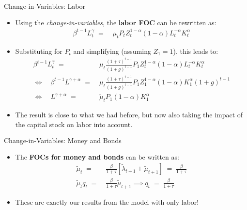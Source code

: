 \documentclass[10pt,c,aspectratio=1610,handout]{beamer}
\begin{document}
\begin{frame}{Change-in-Variables: Labor}%
  \begin{itemize}%
    \item[$\blacktriangleright$] Using the \emph{change-in-variables}, the \textbf{labor FOC} can be rewritten as:%
    \begin{align*}%
      \beta^{t-1} L_{t}^{\gamma} \; = & \; \mu_{t} P_{t} Z_{t}^{1-\alpha} (1-\alpha) L_{t}^{-\alpha} K_{t}^{\alpha}%
    \end{align*}%
    \vspace*{-0.1in}%
    \pause%
    \item[$\blacktriangleright$] Substituting for $P_t$ and simplifying (assuming $Z_1=1$), this leads to:%
    \begin{align*}%
      \beta^{t-1} L_{t}^{\gamma} \; = & \; \mu_{t} \frac{(1+\tau)^{t-1}}{(1+g)^{t-1}} P_{1} Z_{t}^{1-\alpha} (1-\alpha) L_{t}^{-\alpha} K_{t}^{\alpha}\\%
      \Leftrightarrow \quad \beta^{t-1} L^{\gamma +\alpha} \; = & \; \mu_{t} \frac{(1+\tau)^{t-1}}{(1+g)^{t-1}} P_{1} Z_{1}^{1-\alpha} (1-\alpha) K_{1}^{\alpha} (1+g)^{t-1}\\%
      \Leftrightarrow \quad L^{\gamma+\alpha} \; = & \; \tilde{\mu}_{t} P_{1} (1-\alpha) K_{1}^{\alpha}%
    \end{align*}%
    \vspace*{-0.1in}%
    \pause%
    \item[$\blacktriangleright$] The result is close to what we had before, but now also taking the impact of the capital stock on labor into account.%
  \end{itemize}%
\end{frame}%
\begin{frame}{Change-in-Variables: Money and Bonds}%
  \begin{itemize}%
    \item[$\blacktriangleright$] The \textbf{FOCs for money and bonds} can be written as:%
    \begin{align*}%
      \tilde{\mu}_{t} \; = & \; \frac{\beta}{1+\tau} \left[ \tilde{\lambda}_{t+1} + \tilde{\mu}_{t+1} \right] \; = \; \frac{\beta}{1+\tau}\\%
      \tilde{\mu}_{t} q_{t} \; = & \; \frac{\beta}{1+\tau} \tilde{\mu}_{t+1} \implies q_{t} \; = \; \frac{\beta}{1+\tau}%
    \end{align*}%
    \item[$\blacktriangleright$] These are exactly our results from the model with only labor!%
  \end{itemize}%
\end{frame}%
\end{document}
